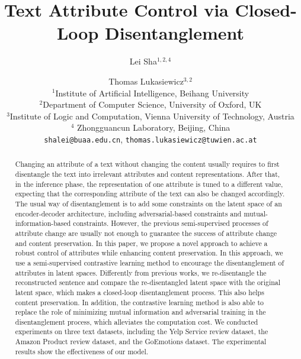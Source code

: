 \documentclass[11pt,a4paper]{article}
\begin{document}
\title{Text Attribute Control via Closed-Loop Disentanglement}
\author{
  Lei Sha$^{1,2,4}$ 
  \and
  Thomas Lukasiewicz$^{3,2}$
  \\
  $^1$Institute of Artificial Intelligence, Beihang University\\
  $^2$Department of Computer Science, University of Oxford, UK \\
  $^3$Institute of Logic and Computation, Vienna University of Technology, Austria\\
  $^4$ Zhongguancun Laboratory, Beijing, China\\
\texttt{shalei@buaa.edu.cn}, \quad\texttt{thomas.lukasiewicz@tuwien.ac.at}
}



\maketitle
\begin{abstract}
Changing an attribute of a text without changing the content  usually requires to first disentangle the text into irrelevant attributes and content representations. After that,  in the inference phase,   the representation of one attribute is tuned to a different value, expecting that the corresponding attribute of the text can also be changed accordingly. The usual way of disentanglement is to add some constraints on the latent space of an encoder-decoder architecture, including adversarial-based constraints and mutual-information-based constraints.
However, the previous semi-supervised processes of attribute change are usually not enough to guarantee the success of attribute change and content preservation.
In this paper, we propose a novel approach to achieve a robust control of attributes while enhancing content preservation. 
In this approach, we use a semi-supervised contrastive learning method to encourage the disentanglement of attributes in latent spaces. Differently from previous works, we re-disentangle the reconstructed sentence and compare the re-disentangled latent space with the original latent space, which makes a closed-loop disentanglement process.  This also helps content preservation. 
In addition,  the contrastive learning method is also able to replace the role of minimizing mutual information and adversarial training in the disentanglement process, which alleviates the computation cost. We conducted experiments on three text datasets, including the Yelp Service review dataset, the Amazon Product review dataset, and the GoEmotions dataset. The experimental results show the effectiveness of our model.


\end{abstract}
\end{document}
